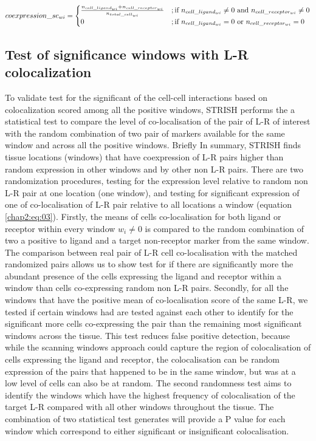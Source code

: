 \begin{equation}
    coexpression\_sc_{wi} = \begin{cases}
    \frac{n_{cell\_ligand_{wi}} + n_{cell\_receptor_{wi}} }{n_{total\_cell_{wi}}}&;\text{if $ n_{cell\_ligand_{wi}} \neq 0$ and $n_{cell\_receptor_{wi}} \neq 0$}\\
    0              & ;\text{if $ n_{cell\_ligand_{wi}} = 0$ or $n_{cell\_receptor_{wi}} = 0$}
    \label{chap2:eq:02}
\end{cases}
\end{equation}

\subsection{Test of significance windows with L-R colocalization}
To validate test for the significant of the cell-cell interactions based on colocalization scored among all the positive windows, STRISH performs the a statistical test to compare the level of co-localisation of the pair of L-R of interest with the random combination of two pair of markers available for the same window and across all the positive windows. Briefly In summary, STRISH finds tissue locations (windows) that have coexpression of L-R pairs higher than random expression in other windows and by other non L-R pairs. There are two randomization procedures, testing for the expression level relative to random non L-R pair at one location (one window), and testing for significant expression of one of co-localisation of L-R pair relative to all locations a window (equation \ref{chap2:eq:03}). Firstly, the means of cells co-localisation for both ligand or receptor within every window $w_i \neq 0$ is compared to the random combination of two a positive to ligand and a target non-receptor marker from the same window. The comparison between real pair of L-R cell co-localisation with the matched randomized pairs allows us to show test for if there are significantly more the abundant presence of the cells expressing  the ligand and receptor within a window than cells co-expressing random non L-R pairs. Secondly, for all the windows that have the positive mean of co-localisation score of the same L-R, we tested if certain windows had  are tested against each other to identify for the significant more cells co-expressing the pair than the remaining  most significant windows across the tissue. This test reduces false positive detection, because while the scanning windows approach could capture the region of colocalisation of cells expressing the ligand and receptor, the colocalisation can be random expression of the pairs that happened to be in the same window, but was at a low level of cells can also be at random. The second randomness test aims to identify the windows which have the highest frequency of colocalisation of the target L-R compared with all other windows throughout the tissue. The combination of two statistical test generates will provide a P value for each window which correspond to either significant or insignificant colocalisation.

